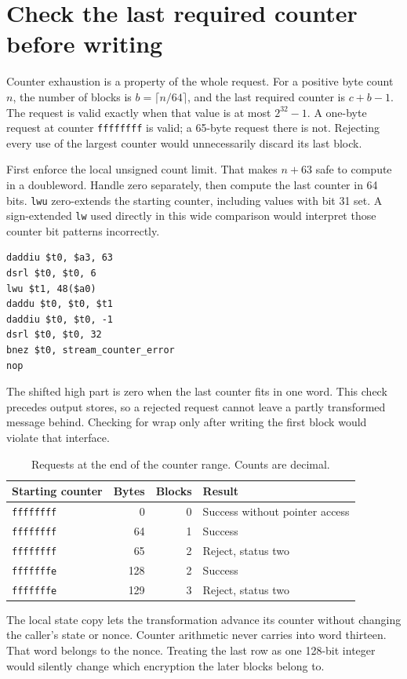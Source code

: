 \section{Check the last required counter before writing}
Counter exhaustion is a property of the whole request. For a positive byte count
\(n\), the number of blocks is \(b=\lceil n/64\rceil\), and the last required
counter is \(c+b-1\). The request is valid exactly when that value is at most
\(2^{32}-1\). A one-byte request at counter \texttt{ffffffff} is valid; a
65-byte request there is not. Rejecting every use of the largest counter would
unnecessarily discard its last block.

First enforce the local unsigned count limit. That makes \(n+63\) safe to compute
in a doubleword. Handle zero separately, then compute the last counter in 64 bits.
\texttt{lwu} zero-extends the starting counter, including values with bit 31 set.
A sign-extended \texttt{lw} used directly in this wide comparison would interpret
those counter bit patterns incorrectly.
\begin{verbatim}
daddiu $t0, $a3, 63
dsrl $t0, $t0, 6
lwu $t1, 48($a0)
daddu $t0, $t0, $t1
daddiu $t0, $t0, -1
dsrl $t0, $t0, 32
bnez $t0, stream_counter_error
nop
\end{verbatim}

The shifted high part is zero when the last counter fits in one word. This check
precedes output stores, so a rejected request cannot leave a partly transformed
message behind. Checking for wrap only after writing the first block would violate
that interface.

\begin{table}[htbp]\centering
  \caption{Requests at the end of the counter range. Counts are decimal.}
  \begin{tabular}{lrrl}\toprule
    Starting counter  & Bytes & Blocks & Result                         \\\midrule
    \texttt{ffffffff} & 0     & 0      & Success without pointer access \\
    \texttt{ffffffff} & 64    & 1      & Success                        \\
    \texttt{ffffffff} & 65    & 2      & Reject, status two             \\
    \texttt{fffffffe} & 128   & 2      & Success                        \\
    \texttt{fffffffe} & 129   & 3      & Reject, status two             \\
    \bottomrule\end{tabular}\end{table}

The local state copy lets the transformation advance its counter without changing
the caller's state or nonce. Counter arithmetic never carries into word thirteen.
That word belongs to the nonce. Treating the last row as one 128-bit integer would
silently change which encryption the later blocks belong to.
